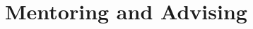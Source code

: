 \documentclass[11pt, letterpaper, sans]{moderncv}
\begin{document}

\section{Mentoring and Advising}
\end{document}
